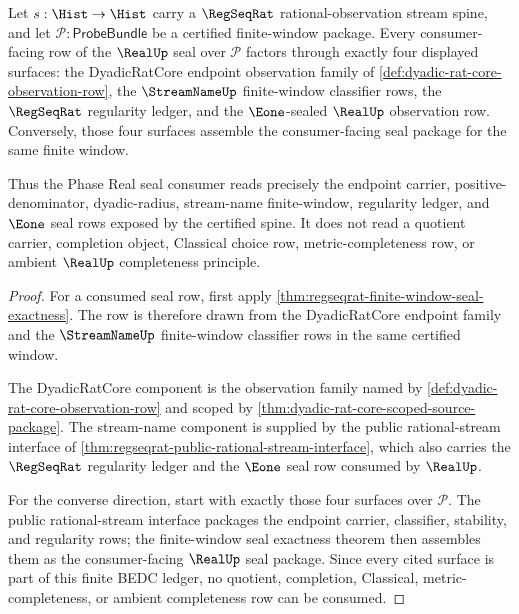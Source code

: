 \begin{theorem}
\label{thm:real-phase-seal-consumer-exactness}
Let $s:\Hist\to\Hist$ carry a $\RegSeqRat$ rational-observation stream spine,
and let $\mathcal{P}:\mathsf{ProbeBundle}$ be a certified finite-window package.
Every consumer-facing row of the $\RealUp$ seal over $\mathcal{P}$ factors
through exactly four displayed surfaces: the DyadicRatCore endpoint observation
family of \autoref{def:dyadic-rat-core-observation-row}, the $\StreamNameUp$
finite-window classifier rows, the $\RegSeqRat$ regularity ledger, and the
$\Eone$-sealed $\RealUp$ observation row. Conversely, those four surfaces
assemble the consumer-facing seal package for the same finite window.

Thus the Phase Real seal consumer reads precisely the endpoint carrier,
positive-denominator, dyadic-radius, stream-name finite-window, regularity
ledger, and $\Eone$ seal rows exposed by the certified spine. It does not read a
quotient carrier, completion object, Classical choice row, metric-completeness
row, or ambient $\RealUp$ completeness principle.
\end{theorem}
\begin{proof}
For a consumed seal row, first apply
\autoref{thm:regseqrat-finite-window-seal-exactness}. The row is therefore
drawn from the DyadicRatCore endpoint family and the $\StreamNameUp$
finite-window classifier rows in the same certified window.

The DyadicRatCore component is the observation family named by
\autoref{def:dyadic-rat-core-observation-row} and scoped by
\autoref{thm:dyadic-rat-core-scoped-source-package}. The stream-name component
is supplied by the public rational-stream interface of
\autoref{thm:regseqrat-public-rational-stream-interface}, which also carries the
$\RegSeqRat$ regularity ledger and the $\Eone$ seal row consumed by $\RealUp$.

For the converse direction, start with exactly those four surfaces over
$\mathcal{P}$. The public rational-stream interface packages the endpoint
carrier, classifier, stability, and regularity rows; the finite-window seal
exactness theorem then assembles them as the consumer-facing $\RealUp$ seal
package. Since every cited surface is part of this finite BEDC ledger, no
quotient, completion, Classical, metric-completeness, or ambient completeness
row can be consumed.
\end{proof}
